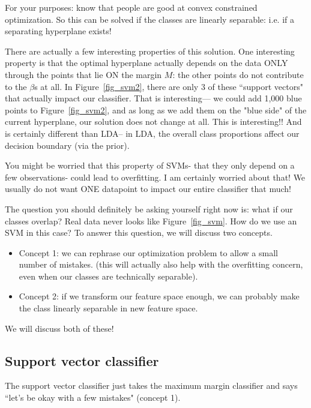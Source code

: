 For your purposes: know that people are good at convex constrained optimization. So this can be solved if the classes are linearly separable: i.e. if a separating hyperplane exists! 

There are actually a few interesting properties of this solution. One interesting property is that the optimal hyperplane actually depends on the data ONLY through the points that lie ON the margin $M$: the other points do not contribute to the $\beta$s at all. In Figure~\ref{fig_svm2}, there are only 3 of these ``support vectors" that actually impact our classifier. That is interesting--- we could add 1,000 blue points to Figure~\ref{fig_svm2}, and as long as we add them on the "blue side" of the current hyperplane, our solution does not change at all. This is interesting!! And is certainly different than LDA-- in LDA, the overall class proportions affect our decision boundary (via the prior). 

You might be worried that this property of SVMs- that they only depend on a few observations- could lead to overfitting. I am certainly worried about that! We usually do not want ONE datapoint to impact our entire classifier that much!

The question you should definitely be asking yourself right now is: what if our classes overlap? Real data never looks like Figure~\ref{fig_svm}. How do we use an SVM in this case? To answer this question, we will discuss two concepts.
\begin{itemize}
\item Concept 1: we can rephrase our optimization problem to allow a small number of mistakes. (this will actually also help with the overfitting concern, even when our classes are technically separable). 
\item Concept 2: if we transform our feature space enough, we can probably make the class linearly separable in new feature space. 
\end{itemize}

We will discuss both of these!

\subsection{Support vector classifier}

The support vector classifier just takes the maximum margin classifier and says ``let's be okay with a few mistakes" (concept 1). 

